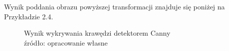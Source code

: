 \documentclass[eng,oneside]{mgr}
\begin{document}
\par Wynik poddania obrazu powyższej transformacji znajduje się poniżej na Przykładzie 2.4.
\begin{figure}[htbp]
\centering
\captionsetup{justification=centering}
\quad
{}
\renewcommand\figurename{Przykład}
\caption{Wynik wykrywania krawędzi detektorem Canny\\ 
źródło: opracowanie własne}
\end{figure}
\end{document}
